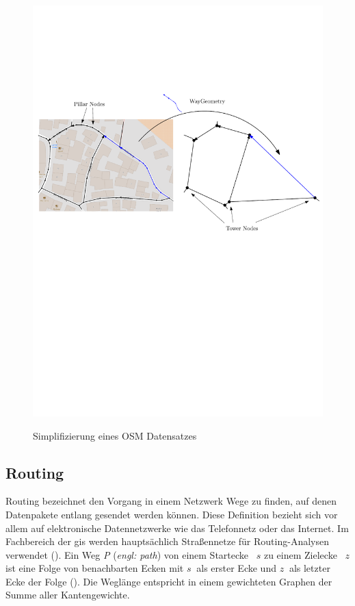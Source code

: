 \begin{figure}[h]
\centering
\includegraphics[width = \textwidth]{../media/towers.pdf} \\
\caption{Simplifizierung eines OSM Datensatzes}
\label{fig:tower}
\end{figure}

\subsection{Routing}

Routing bezeichnet den Vorgang in einem Netzwerk Wege zu finden, auf denen Datenpakete entlang gesendet werden können. Diese Definition bezieht sich vor allem auf elektronische Datennetzwerke wie das Telefonnetz oder das Internet. Im Fachbereich der \gls{gis} werden hauptsächlich Straßennetze für Routing-Analysen verwendet (\cite[165]{handbook}). Ein Weg \textit{P} (\textit{engl: path}) von einem Startecke ~$s$ zu einem Zielecke ~$z$ ist eine Folge von benachbarten Ecken mit $s~$ als erster Ecke und $z~$ als letzter Ecke der Folge ().
Die Weglänge entspricht in einem gewichteten Graphen der Summe aller Kantengewichte.

